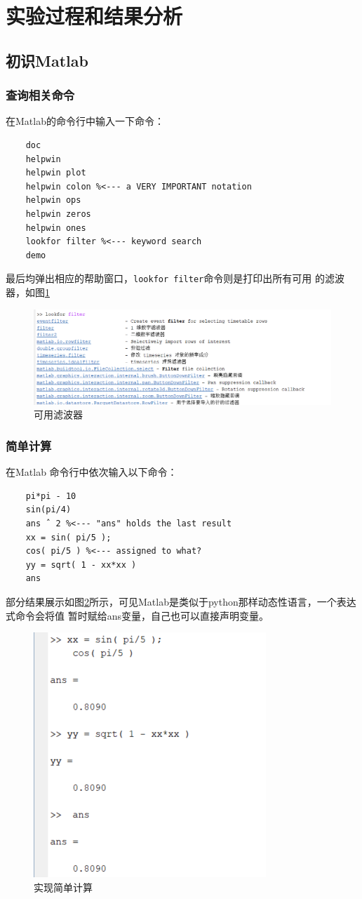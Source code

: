 \documentclass[UTF8]{ctexart}
\begin{document}
\section{实验过程和结果分析}
\subsection{初识Matlab}
\subsubsection{查询相关命令}
在Matlab的命令行中输入一下命令：
\begin{verbatim}
    doc
    helpwin
    helpwin plot
    helpwin colon %<--- a VERY IMPORTANT notation 
    helpwin ops 
    helpwin zeros 
    helpwin ones 
    lookfor filter %<--- keyword search
    demo
\end{verbatim}
最后均弹出相应的帮助窗口，\verb|lookfor filter|命令则是打印出所有可用
的滤波器，如图\ref{img:lookfor}
\begin{figure}[htbp]
    \centering
    \includegraphics[width=0.8\linewidth]{lookfor_fliter.png}
    \caption{可用滤波器}
    \label{img:lookfor}
\end{figure}
\subsubsection{简单计算}
在Matlab 命令行中依次输入以下命令：
\begin{verbatim}
    pi*pi - 10 
    sin(pi/4) 
    ans ˆ 2 %<--- "ans" holds the last result 
    xx = sin( pi/5 ); 
    cos( pi/5 ) %<--- assigned to what? 
    yy = sqrt( 1 - xx*xx ) 
    ans
\end{verbatim}
部分结果展示如图\ref{img:var}所示，可见Matlab是类似于python那样动态性语言，一个表达式命令会将值
暂时赋给ans变量，自己也可以直接声明变量。
\begin{figure}[htbp]
    \centering
    \includegraphics[width=0.6\linewidth]{var.png}
    \caption{实现简单计算}
    \label{img:var}
\end{figure}
\end{document}
